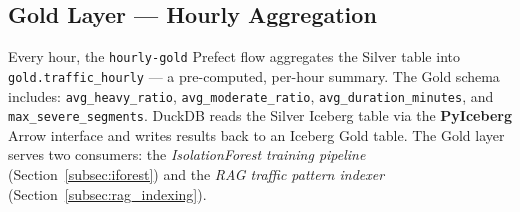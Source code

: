   \subsection{Gold Layer — Hourly Aggregation}                                                                                                            
  \label{subsec:gold}                                                                                                                                     
                                                                                                                                                          
  Every hour, the \texttt{hourly-gold} Prefect flow aggregates the Silver                                                                                 
  table into \texttt{gold.traffic\_hourly}\allowbreak{} --- a pre-computed,
  per-hour summary. The Gold schema includes: \texttt{avg\_heavy\_ratio},                                                                                 
  \texttt{avg\_moderate\_ratio}, \texttt{avg\_duration\_minutes}, and                                                                                     
  \texttt{max\_severe\_segments}. DuckDB reads the Silver Iceberg table                                                                                   
  via the \textbf{PyIceberg} \cite{pyiceberg_docs} Arrow interface and                                                                                    
  writes results back to an Iceberg Gold table. The Gold layer serves                                                                                     
  two consumers: the \textit{IsolationForest training pipeline}                                                                                           
  (Section~\ref{subsec:iforest}) and the \textit{RAG traffic pattern                                                                                      
  indexer} (Section~\ref{subsec:rag_indexing}).                                                                                                           
                                                                                                                                                          
